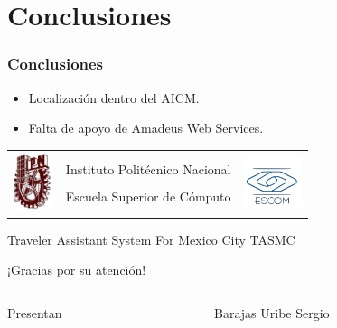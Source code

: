 \documentclass[12pt]{beamer}
\begin{document}
\section{Conclusiones}

\begin{frame}
	\frametitle{Conclusiones}
	\begin{block}{}
		\begin{itemize}
	\item Localización dentro del AICM.
	\item Falta de apoyo de Amadeus Web Services.
\end{itemize}
	\end{block}
\end{frame}  

\begin{frame}
	\begin{center}
	\begin{minipage}[t]{0.73\textwidth}	
		\begin{tabular}{ccc}
			\multirow{4}{*}{\includegraphics[height=1.7cm]{imagenes/ipn.png}} &
			&
     	 	\multirow{4}{*}{\includegraphics[height=1.5cm]{imagenes/escom.png}} \\
      		& Instituto Politécnico Nacional & \\
      		& Escuela Superior de Cómputo & \\
      		&&\\
		\end{tabular}
	\end{minipage}
	\end{center}
	
	\begin{center}
		\textcolor[RGB]{0,0,204}{\Large Traveler Assistant System For Mexico City TASMC}
	\end{center}		
	
	\begin{center}
		\Large ¡Gracias por su atención!
	\end{center}
	
	\begin{columns} 
		\begin{column}{0.1cm}
			Presentan
		\end{column}
		\begin{column}{6cm} 
			Barajas Uribe Sergio


\end{column}
\end{columns}
\end{frame}
\end{document}
